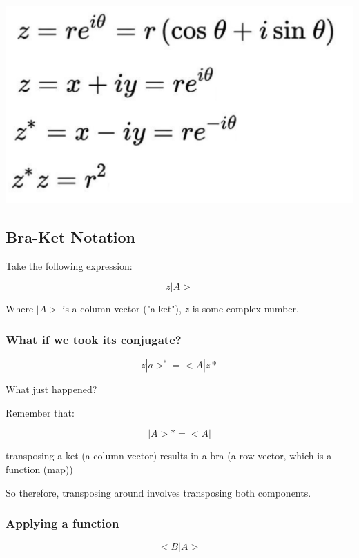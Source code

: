 \documentclass[letterpaper]{article}
\begin{document}
\begin{center}
\includegraphics[width=.9\linewidth]{2022-01-28_09-22-27_screenshot.png}
\end{center}

\subsection{Bra-Ket Notation}
\label{sec:org1623e7b}
Take the following expression:

\begin{equation}
z | A \big>
\end{equation}

Where \(|A\big>\) is a column vector ("a ket"), \(z\) is some complex number.

\subsubsection{What if we took its conjugate?}
\label{sec:orgc9b5822}

\begin{equation}
    z | a\big>^* = \big<A|z*
\end{equation}

What just happened?

Remember that:

\begin{equation}
   |A\big> * = \big<A|
\end{equation}

transposing a ket (a column vector) results in a bra (a row vector, which is a function (map))

So therefore, transposing around involves transposing both components.

\subsubsection{Applying a function}
\label{sec:orgc28d58d}
\begin{equation}
   \big<B|A\big> 
\end{equation}
\end{document}
